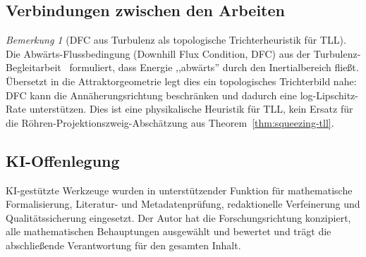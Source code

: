\documentclass[12pt,a4paper]{article}
\theoremstyle{definition}
\theoremstyle{plain}
\theoremstyle{remark}
\newtheorem{remark}[definition]{Bemerkung}
\begin{document}
\subsection{Verbindungen zwischen den Arbeiten}

\begin{remark}[DFC aus Turbulenz als topologische Trichterheuristik für TLL]
\label{rem:dfc-funnel}
Die Abwärts-Flussbedingung (Downhill Flux Condition, DFC) aus der Turbulenz-Begleitarbeit~\cite{FST-NS2026} formuliert, dass Energie ,,abwärts'' durch den Inertialbereich fließt. Übersetzt in die Attraktorgeometrie legt dies ein topologisches Trichterbild nahe: DFC kann die Annäherungsrichtung beschränken und dadurch eine log-Lipschitz-Rate unterstützen. Dies ist eine physikalische Heuristik für TLL, kein Ersatz für die Röhren-Projektionszweig-Abschätzung aus Theorem~\ref{thm:squeezing-tll}.
\end{remark}


\subsection*{KI-Offenlegung}
KI-gestützte Werkzeuge wurden in unterstützender Funktion für
mathematische Formalisierung, Literatur- und Metadatenprüfung,
redaktionelle Verfeinerung und Qualitätssicherung eingesetzt.  Der
Autor hat die Forschungsrichtung konzipiert, alle mathematischen
Behauptungen ausgewählt und bewertet und trägt die abschließende
Verantwortung für den gesamten Inhalt.
\end{document}
